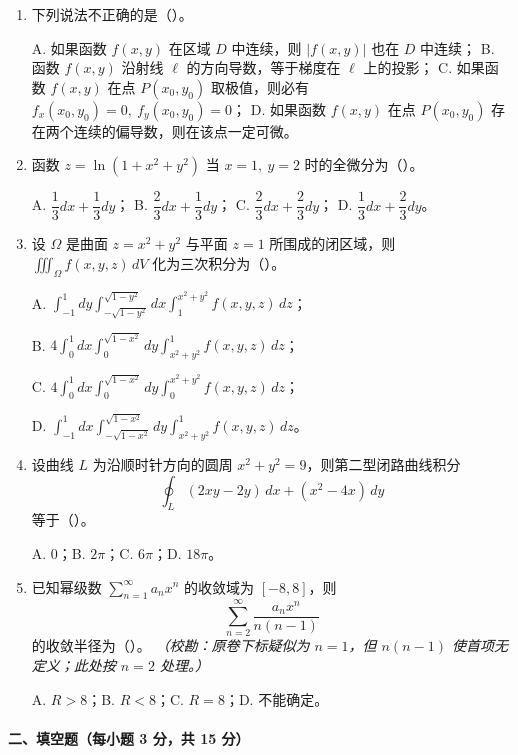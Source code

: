 \begin{enumerate}
  \item 下列说法不正确的是（\quad）。

  A. 如果函数 $f(x,y)$ 在区域 $D$ 中连续，则 $|f(x,y)|$ 也在 $D$ 中连续；\quad
  B. 函数 $f(x,y)$ 沿射线 $\ell$ 的方向导数，等于梯度在 $\ell$ 上的投影；\quad
  C. 如果函数 $f(x,y)$ 在点 $P(x_0,y_0)$ 取极值，则必有 $f_x(x_0,y_0)=0,\ f_y(x_0,y_0)=0$；\quad
  D. 如果函数 $f(x,y)$ 在点 $P(x_0,y_0)$ 存在两个连续的偏导数，则在该点一定可微。

  \item 函数 $z=\ln(1+x^2+y^2)$ 当 $x=1,\ y=2$ 时的全微分为（\quad）。

  A. $\dfrac13dx+\dfrac13dy$；\quad
  B. $\dfrac23dx+\dfrac13dy$；\quad
  C. $\dfrac23dx+\dfrac23dy$；\quad
  D. $\dfrac13dx+\dfrac23dy$。

  \item 设 $\Omega$ 是曲面 $z=x^2+y^2$ 与平面 $z=1$ 所围成的闭区域，则 $\iiint_{\Omega}f(x,y,z)\,dV$ 化为三次积分为（\quad）。

  A. $\displaystyle\int_{-1}^{1}dy\int_{-\sqrt{1-y^2}}^{\sqrt{1-y^2}}dx\int_1^{x^2+y^2}f(x,y,z)\,dz$；

  B. $\displaystyle4\int_0^1dx\int_0^{\sqrt{1-x^2}}dy\int_{x^2+y^2}^{1}f(x,y,z)\,dz$；

  C. $\displaystyle4\int_0^1dx\int_0^{\sqrt{1-x^2}}dy\int_0^{x^2+y^2}f(x,y,z)\,dz$；

  D. $\displaystyle\int_{-1}^{1}dx\int_{-\sqrt{1-x^2}}^{\sqrt{1-x^2}}dy\int_{x^2+y^2}^{1}f(x,y,z)\,dz$。

  \item 设曲线 $L$ 为沿顺时针方向的圆周 $x^2+y^2=9$，则第二型闭路曲线积分
  \[
    \oint_L (2xy-2y)\,dx+(x^2-4x)\,dy
  \]
  等于（\quad）。

  A. $0$；\quad B. $2\pi$；\quad C. $6\pi$；\quad D. $18\pi$。

  \item 已知幂级数 $\sum_{n=1}^{\infty}a_nx^n$ 的收敛域为 $[-8,8]$，则
  \[
    \sum_{n=2}^{\infty}\frac{a_nx^n}{n(n-1)}
  \]
  的收敛半径为（\quad）。
  \textit{（校勘：原卷下标疑似为 $n=1$，但 $n(n-1)$ 使首项无定义；此处按 $n=2$ 处理。）}

  A. $R>8$；\quad B. $R<8$；\quad C. $R=8$；\quad D. 不能确定。
\end{enumerate}

\paragraph{二、填空题（每小题 3 分，共 15 分）}

